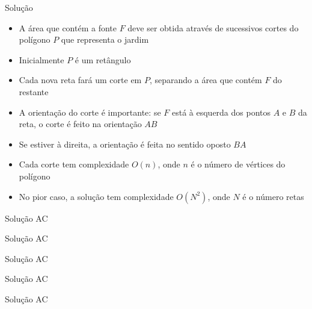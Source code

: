 \begin{frame}[fragile]{Solução}

    \begin{itemize}
        \item A área que contém a fonte $F$ deve ser obtida através de sucessivos cortes do
            polígono $P$ que representa o jardim

        \item Inicialmente $P$ é um retângulo

        \item Cada nova reta fará um corte em $P$, separando a área que contém $F$ do restante

        \item A orientação do corte é importante: se $F$ está à esquerda dos pontos $A$ e $B$ da
            reta, o corte é feito na orientação $AB$

        \item Se estiver à direita, a orientação é feita no sentido oposto $BA$ 

        \item Cada corte tem complexidade $O(n)$, onde $n$ é o número de vértices do polígono

        \item No pior caso, a solução tem complexidade $O(N^2)$, onde $N$ é o número retas
    \end{itemize}

\end{frame}

\begin{frame}[fragile]{Solução AC}
\end{frame}

\begin{frame}[fragile]{Solução AC}
\end{frame}

\begin{frame}[fragile]{Solução AC}
\end{frame}

\begin{frame}[fragile]{Solução AC}
\end{frame}

\begin{frame}[fragile]{Solução AC}
\end{frame}
